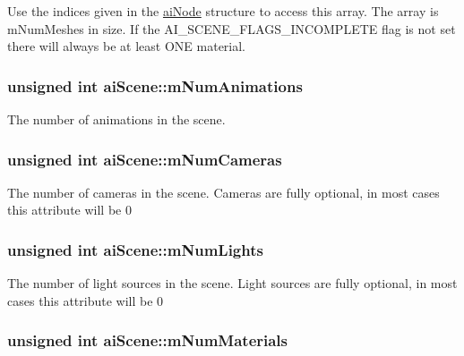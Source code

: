 Use the indices given in the \hyperlink{structai_node}{ai\-Node} structure to access this array. The array is m\-Num\-Meshes in size. If the A\-I\-\_\-\-S\-C\-E\-N\-E\-\_\-\-F\-L\-A\-G\-S\-\_\-\-I\-N\-C\-O\-M\-P\-L\-E\-T\-E flag is not set there will always be at least O\-N\-E material. \hypertarget{structai_scene_aa2af030ec218ead0dc062b6a96a7471a}{
\subsubsection[{m\-Num\-Animations}]{\setlength{\rightskip}{0pt plus 5cm}unsigned int ai\-Scene\-::m\-Num\-Animations}}\label{structai_scene_aa2af030ec218ead0dc062b6a96a7471a}
The number of animations in the scene. \hypertarget{structai_scene_a4abc432e1b22a7e01553f33c79c0592f}{
\subsubsection[{m\-Num\-Cameras}]{\setlength{\rightskip}{0pt plus 5cm}unsigned int ai\-Scene\-::m\-Num\-Cameras}}\label{structai_scene_a4abc432e1b22a7e01553f33c79c0592f}
The number of cameras in the scene. Cameras are fully optional, in most cases this attribute will be 0 \hypertarget{structai_scene_a0c90fc5f15b979e0bb0d3e8f1e246307}{
\subsubsection[{m\-Num\-Lights}]{\setlength{\rightskip}{0pt plus 5cm}unsigned int ai\-Scene\-::m\-Num\-Lights}}\label{structai_scene_a0c90fc5f15b979e0bb0d3e8f1e246307}
The number of light sources in the scene. Light sources are fully optional, in most cases this attribute will be 0 \hypertarget{structai_scene_a4277d8bffe8b8f568098af6c31d042b7}{
\subsubsection[{m\-Num\-Materials}]{\setlength{\rightskip}{0pt plus 5cm}unsigned int ai\-Scene\-::m\-Num\-Materials}}\label{structai_scene_a4277d8bffe8b8f568098af6c31d042b7}
